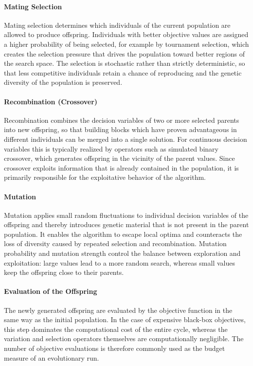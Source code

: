 \paragraph{Mating Selection}
Mating selection determines which individuals of the current population are allowed to produce
offspring. Individuals with better objective values are assigned a higher probability of being
selected, for example by tournament selection, which creates the selection pressure that drives the
population toward better regions of the search space. The selection is stochastic rather than
strictly deterministic, so that less competitive individuals retain a chance of reproducing and the
genetic diversity of the population is preserved.

\paragraph{Recombination (Crossover)}
Recombination combines the decision variables of two or more selected parents into new offspring, so
that building blocks which have proven advantageous in different individuals can be merged into a
single solution. For continuous decision variables this is typically realized by operators such as
simulated binary crossover, which generates offspring in the vicinity of the parent values. Since
crossover exploits information that is already contained in the population, it is primarily
responsible for the exploitative behavior of the algorithm.

\paragraph{Mutation}
Mutation applies small random fluctuations to individual decision variables of the offspring and
thereby introduces genetic material that is not present in the parent population. It enables the
algorithm to escape local optima and counteracts the loss of diversity caused by repeated selection
and recombination. Mutation probability and mutation strength control the balance between
exploration and exploitation: large values lead to a more random search, whereas small values keep
the offspring close to their parents.

\paragraph{Evaluation of the Offspring}
The newly generated offspring are evaluated by the objective function in the same way as the initial
population. In the case of expensive black-box objectives, this step dominates the computational
cost of the entire cycle, whereas the variation and selection operators themselves are
computationally negligible. The number of objective evaluations is therefore commonly used as the
budget measure of an evolutionary run.

